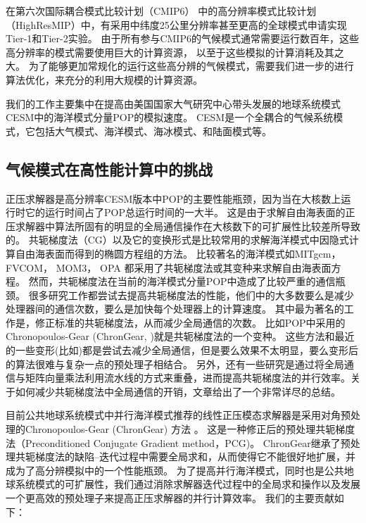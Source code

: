 在第六次国际耦合模式比较计划（CMIP6） 中的高分辨率模式比较计划（HighResMIP）中，有采用中纬度25公里分辨率甚至更高的全球模式申请实现Tier-1和Tier-2实验。 
由于所有参与CMIP6的气候模式通常需要运行数百年，这些高分辨率的模式需要使用巨大的计算资源， 以至于这些模拟的计算消耗及其之大。
为了能够更加常规化的运行这些高分辨的气候模式，需要我们进一步的进行算法优化，来充分的利用大规模的计算资源。

 
我们的工作主要集中在提高由美国国家大气研究中心带头发展的地球系统模式CESM中的海洋模式分量POP的模拟速度。 CESM是一个全耦合的气候系统模式，它包括大气模式、海洋模式、海冰模式、和陆面模式等。


\subsection{气候模式在高性能计算中的挑战}
 
正压求解器是高分辨率CESM版本中POP的主要性能瓶颈，因为当在大核数上运行时它的运行时间占了POP总运行时间的一大半。 
这是由于求解自由海表面的正压求解器中算法所固有的明显的全局通信操作在大核数下的可扩展性比较差所导致的。
共轭梯度法（CG）以及它的变换形式是比较常用的求解海洋模式中因隐式计算自由海表面而得到的椭圆方程组的方法。
比较著名的海洋模式如MITgcm\citep{adcroft2014mitgcm}， FVCOM\citep{lai2010nonhydrostatic}， MOM3\citep{pacanowsky1999mom3}， OPA \citep{madec1997ocean}
都采用了共轭梯度法或其变种来求解自由海表面方程。
然而，共轭梯度法在当前的海洋模式分量POP中造成了比较严重的通信瓶颈\citep{Worley:2011:PCE:2063384.2063457}。 
很多研究工作都尝试去提高共轭梯度法的性能，他们中的大多数要么是减少处理器间的通信次数，要么是加快每个处理器上的计算速度。
其中最为著名的工作是，修正标准的共轭梯度法，从而减少全局通信的次数。 比如POP中采用的Chronopoulos-Gear (ChronGear, \cite{dAzevedo1999lapack})就是共轭梯度法的一个变种。
这些方法和最近的一些变形(比如\cite{hoemmen2010})都是尝试去减少全局通信，但是要么效果不太明显，要么变形后的算法很难与复杂一点的预处理子相结合\citep{ghysels2014}。
另外，还有一些研究是通过将全局通信与矩阵向量乘法利用流水线的方式来重叠，进而提高共轭梯度法的并行效率。关于如何减少共轭梯度法中全局通信的开销，文章\cite{ghysels2014}给出了一个非常详尽的总结。

目前公共地球系统模式中并行海洋模式推荐的线性正压模态求解器是采用对角预处理的Chronopoulos-Gear (ChronGear) 方法
\cite{dAzevedo1999lapack}。 这是一种修正后的预处理共轭梯度法（Preconditioned Conjugate
Gradient method，PCG)。 
ChronGear继承了预处理共轭梯度法的缺陷--迭代过程中需要全局求和，从而使得它不能很好地扩展，并成为了高分辨模拟中的一个性能瓶颈。
为了提高并行海洋模式，同时也是公共地球系统模式的可扩展性，我们通过消除求解器迭代过程中的全局求和操作以及发展一个更高效的预处理子来提高正压求解器的并行计算效率。
我们的主要贡献如下： 
 

